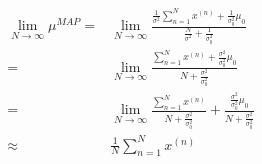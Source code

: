 \documentclass[../main.tex]{subfiles}
\begin{document}
\begin{align*}
    \lim_{N \to \infty}\mu^{MAP}
    = & \lim_{N \to \infty}
        \frac{\frac{1}{\sigma^2}\sum^N_{n=1}x^{(n)}
        + \frac{1}{\sigma_0^2} \mu_0}
        {\frac{N}{\sigma^2} + \frac{1}{\sigma_0^2}} \\
    = & \lim_{N \to \infty}
        \frac{\sum^N_{n=1}x^{(n)}
        + \frac{\sigma^2}{\sigma_0^2} \mu_0}
        {N + \frac{\sigma^2}{\sigma_0^2}} \\
    = & \lim_{N \to \infty}
        \frac{\sum^N_{n=1}x^{(n)}}
        {N + \frac{\sigma^2}{\sigma_0^2}}
        + \frac{\frac{\sigma^2}{\sigma_0^2} \mu_0}
        {N + \frac{\sigma^2}{\sigma_0^2}} \\
    \approx & \frac{1}{N} \sum^N_{n=1}x^{(n)}
\end{align*}
\end{document}
